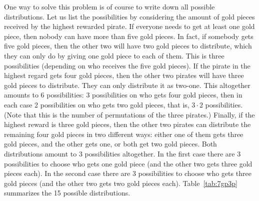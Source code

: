 One way to solve this problem is of course to write down all possible distributions. 
Let us list the possibilities by considering the amount of gold pieces received by the highest rewarded pirate. 
If everyone needs to get at least one gold piece, then nobody can have more than five gold pieces. 
In fact, if somebody gets five gold pieces, 
then the other two will have two gold pieces to distribute, 
which they can only do by giving one gold piece to each of them. 
This is three possibilities (depending on who receives the five gold pieces). 
If the pirate in the highest regard gets four gold pieces, 
then the other two pirates will have three gold pieces to distribute. 
They can only distribute it as two-one. 
This altogether amounts to 6 possibilities: 3 possibilities on who gets four gold pieces, 
then in each case 2 possibilities on who gets two gold pieces, 
that is, $3 \cdot 2$ possibilities. 
(Note that this is the number of permutations of the three pirates.)
Finally, if the highest reward is three gold pieces, 
then the other two pirates can distribute the remaining four gold pieces in two different ways: 
either one of them gets three gold pieces, and the other gets one, 
or both get two gold pieces. 
Both distributions amount to 3 possibilities altogether. 
In the first case there are 3 possibilities to choose who gets one gold piece (and the other two gets three gold pieces each). 
In the second case there are 3 possibilities to choose who gets three gold pieces (and the other two gets two gold pieces each). 
Table~\ref{tab:7gp3p} summarizes the 15 possible distributions. 

\newpage

